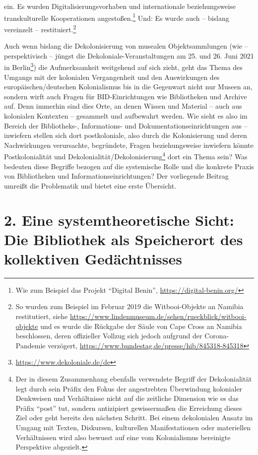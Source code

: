 \documentclass[a4paper,
fontsize=11pt,
oneside,
numbers=noperiodatend,
parskip=half-,
bibliography=totoc,
final
]{scrartcl}
\begin{document}
ein. Es wurden Digitalisierungsvorhaben und internationale
beziehungsweise transkulturelle Kooperationen angestoßen.\footnote{Wie
  zum Beispiel das Projekt \enquote{Digital Benin},
  \url{https://digital-benin.org/}} Und: Es wurde auch -- bislang
vereinzelt -- restituiert.\footnote{So wurden zum Beispiel im Februar
  2019 die Witbooi-Objekte an Namibia restitutiert, siehe
  \url{https://www.lindenmuseum.de/sehen/rueckblick/witbooi-objekte} und
  es wurde die Rückgabe der Säule von Cape Cross an Namibia beschlossen,
  deren offizieller Vollzug sich jedoch aufgrund der Corona-Pandemie
  verzögert, \url{https://www.bundestag.de/presse/hib/845318-845318}}

Auch wenn bislang die Dekolonisierung von musealen Objektsammlungen (wie
-- perspektivisch -- jüngst die Dekoloniale-Veranstaltungen am 25. und 26.
Juni 2021 in Berlin\footnote{\url{https://www.dekoloniale.de/de}}) die
Aufmerksamkeit weitgehend auf sich zieht, geht das Thema des Umgangs mit
der kolonialen Vergangenheit und den Auswirkungen des
europäischen/deutschen Kolonialismus bis in die Gegenwart nicht nur
Museen an, sondern wirft auch Fragen für BID-Einrichtungen wie
Bibliotheken und Archive auf. Denn immerhin sind dies Orte, an denen
Wissen und Material -- auch aus kolonialen Kontexten -- gesammelt und
aufbewahrt werden. Wie sieht es also im Bereich der Bibliotheks-,
Informations- und Dokumentationseinrichtungen aus -- inwiefern stellen
sich dort postkoloniale, also durch die Kolonisierung und deren
Nachwirkungen verursachte, begründete, Fragen beziehungsweise inwiefern
könnte Postkolonialität und Dekolonialität/Dekolonisierung\footnote{Der
  in diesem Zusammenhang ebenfalls verwendete Begriff der Dekolonialität
  legt durch sein Präfix den Fokus der angestrebten Überwindung
  kolonialer Denkweisen und Verhältnisse nicht auf die zeitliche
  Dimension wie es das Präfix \enquote{post} tut, sondern antizipiert
  gewissermaßen die Erreichung dieses Ziel oder geht bereits den
  nächsten Schritt. Bei einem dekolonialen Ansatz im Umgang mit Texten,
  Diskursen, kulturellen Manifestationen oder materiellen Verhältnissen
  wird also bewusst auf eine vom Kolonialismus bereinigte Perspektive
  abgezielt.} dort ein Thema sein? Was bedeuten diese Begriffe bezogen
auf die systemische Rolle und die konkrete Praxis von Bibliotheken und
Informationseinrichtungen? Der vorliegende Beitrag umreißt die
Problematik und bietet eine erste Übersicht.

\hypertarget{eine-systemtheoretische-sicht-die-bibliothek-als-speicherort-des-kollektiven-geduxe4chtnisses}{%
\section{2. Eine systemtheoretische Sicht: Die Bibliothek als
Speicherort des kollektiven
Gedächtnisses}\label{eine-systemtheoretische-sicht-die-bibliothek-als-speicherort-des-kollektiven-geduxe4chtnisses}}
\end{document}
